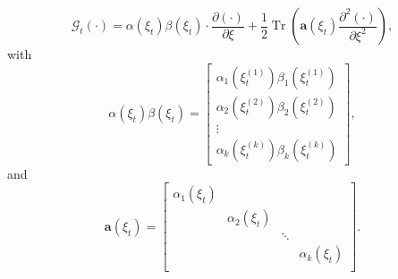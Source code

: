 \documentclass[letterpaper]{article} %
\begin{document}
\begin{equation}
\label{eq:Gt_def}
   \mathcal{G}_t  (\cdot)=\alpha\left(\xi_t\right) \beta\left(\xi_t\right) \cdot \frac{\partial (\cdot)}{\partial \xi}
    +\frac{1}{2} \operatorname{Tr}\left(\mathbf{a}\left(\xi_t\right) \frac{\partial^2 (\cdot)}{\partial \xi^2}
    \right),
\end{equation}
with 
\begin{equation}
    \alpha\left(\xi_t\right) \beta\left(\xi_t\right) = \begin{bmatrix}
    \alpha_1\left(\xi^{(1)}_t\right) \beta_1\left(\xi^{(1)}_t\right) \\
    \alpha_2\left(\xi^{(2)}_t\right) \beta_2\left(\xi^{(2)}_t\right) \\
    \vdots \\
    \alpha_k\left(\xi^{(k)}_t\right) \beta_k\left(\xi^{(k)}_t\right)
    \end{bmatrix},
\end{equation}
and
\begin{equation}
    \mathbf{a}\left(\xi_t\right) = \begin{bmatrix}
    \alpha_1\left(\xi_t\right) &  &  \\
    & \alpha_2\left(\xi_t\right) &  &  \\
    &  & \ddots &  \\
    &  &  & \alpha_k\left(\xi_t\right) \\
    \end{bmatrix}.
\end{equation}
\end{document}
